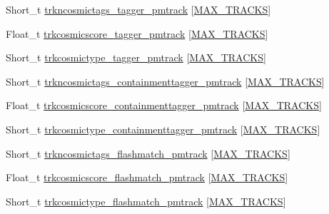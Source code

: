 \begin{DoxyCompactItemize}
\item 
Short\-\_\-t \hyperlink{classanatree_a6e90e245b33c9df0d46d3ce8ed97a291}{trkncosmictags\-\_\-tagger\-\_\-pmtrack} \mbox{[}\hyperlink{anatree__core__v09410002__orig_8h_a327fd4e796e4a0d78947524c96e4362e}{M\-A\-X\-\_\-\-T\-R\-A\-C\-K\-S}\mbox{]}
\item 
Float\-\_\-t \hyperlink{classanatree_a856fef9df06a4d333839520c67a554b0}{trkcosmicscore\-\_\-tagger\-\_\-pmtrack} \mbox{[}\hyperlink{anatree__core__v09410002__orig_8h_a327fd4e796e4a0d78947524c96e4362e}{M\-A\-X\-\_\-\-T\-R\-A\-C\-K\-S}\mbox{]}
\item 
Short\-\_\-t \hyperlink{classanatree_ae01a6e74143af9a7820cdc20b2054555}{trkcosmictype\-\_\-tagger\-\_\-pmtrack} \mbox{[}\hyperlink{anatree__core__v09410002__orig_8h_a327fd4e796e4a0d78947524c96e4362e}{M\-A\-X\-\_\-\-T\-R\-A\-C\-K\-S}\mbox{]}
\item 
Short\-\_\-t \hyperlink{classanatree_a044131062eaf456813e635cfb3612696}{trkncosmictags\-\_\-containmenttagger\-\_\-pmtrack} \mbox{[}\hyperlink{anatree__core__v09410002__orig_8h_a327fd4e796e4a0d78947524c96e4362e}{M\-A\-X\-\_\-\-T\-R\-A\-C\-K\-S}\mbox{]}
\item 
Float\-\_\-t \hyperlink{classanatree_a9d24db71f0761252055c3dbc049aaab6}{trkcosmicscore\-\_\-containmenttagger\-\_\-pmtrack} \mbox{[}\hyperlink{anatree__core__v09410002__orig_8h_a327fd4e796e4a0d78947524c96e4362e}{M\-A\-X\-\_\-\-T\-R\-A\-C\-K\-S}\mbox{]}
\item 
Short\-\_\-t \hyperlink{classanatree_a93f811617f430448d8b39f7c5329d09e}{trkcosmictype\-\_\-containmenttagger\-\_\-pmtrack} \mbox{[}\hyperlink{anatree__core__v09410002__orig_8h_a327fd4e796e4a0d78947524c96e4362e}{M\-A\-X\-\_\-\-T\-R\-A\-C\-K\-S}\mbox{]}
\item 
Short\-\_\-t \hyperlink{classanatree_a611c36f3d47daa5400da697ca9c4da77}{trkncosmictags\-\_\-flashmatch\-\_\-pmtrack} \mbox{[}\hyperlink{anatree__core__v09410002__orig_8h_a327fd4e796e4a0d78947524c96e4362e}{M\-A\-X\-\_\-\-T\-R\-A\-C\-K\-S}\mbox{]}
\item 
Float\-\_\-t \hyperlink{classanatree_a0d7f1227e5a1cc04e53bec32972760a1}{trkcosmicscore\-\_\-flashmatch\-\_\-pmtrack} \mbox{[}\hyperlink{anatree__core__v09410002__orig_8h_a327fd4e796e4a0d78947524c96e4362e}{M\-A\-X\-\_\-\-T\-R\-A\-C\-K\-S}\mbox{]}
\item 
Short\-\_\-t \hyperlink{classanatree_a142fa7ffc0bf06b4afd54da839cf7032}{trkcosmictype\-\_\-flashmatch\-\_\-pmtrack} \mbox{[}\hyperlink{anatree__core__v09410002__orig_8h_a327fd4e796e4a0d78947524c96e4362e}{M\-A\-X\-\_\-\-T\-R\-A\-C\-K\-S}\mbox{]}

\end{DoxyCompactItemize}

